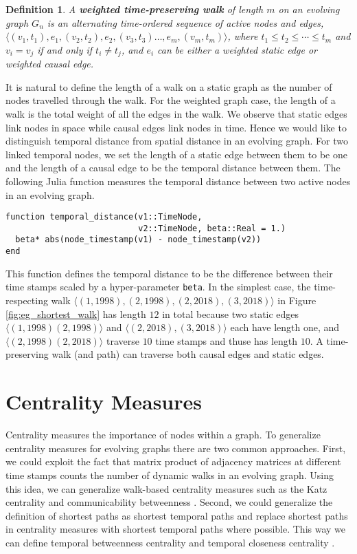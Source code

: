 \documentclass[12pt]{article}
\newtheorem{definition}{Definition}
\theoremstyle{definition}
\begin{document}
\begin{definition}
A \textbf{weighted time-preserving walk} of length $m$ on an evolving graph $G_n$ is an alternating
time-ordered sequence of active nodes and edges, $\langle (v_1, t_1), e_1, (v_2, t_2), e_2, (v_3, t_3) \ldots, e_m, (v_m, t_m) \rangle$, where $t_1 \le t_2 \le \cdots \le t_m$ and
$v_i = v_j$ if and only if $t_i \ne t_j$, and $e_i$ can be either a weighted static edge or weighted causal edge.
\end{definition}

It is natural to define the length of a walk on a static graph as the number of nodes travelled through the walk. For the weighted graph case, the length of a walk is the total weight of all the edges in the walk. We observe that static edges link nodes in space while causal edges link nodes in time. Hence we would like to distinguish temporal distance from spatial distance in an evolving graph.
For two linked temporal nodes, we set the length of a static edge between them to be one and the length of a causal edge to be the temporal distance between them.
The following Julia function measures the temporal distance between two active nodes in an evolving graph.
\begin{lstlisting}
function temporal_distance(v1::TimeNode,
                           v2::TimeNode, beta::Real = 1.)
  beta* abs(node_timestamp(v1) - node_timestamp(v2))
end
\end{lstlisting}
This function defines the temporal distance to be the difference between their time stamps scaled by a hyper-parameter
\texttt{beta}.
In the simplest case, the time-respecting walk
$\langle (1, 1998) ,(2, 1998) , (2, 2018), (3, 2018)\rangle$ in Figure \ref{fig:eg_shortest_walk} has length $12$ in total because two static edges $\langle (1, 1998) (2, 1998) \rangle$ and $\langle (2, 2018), (3, 2018) \rangle$ each have length one, and $\langle (2, 1998) (2, 2018) \rangle$
traverse $10$ time stamps and thuse has length $10$.
A time-preserving walk (and path) can traverse both causal edges and static edges.

\section{Centrality Measures}
\label{sec:topol-temp-flow}

Centrality measures the importance of nodes within a graph.
To generalize centrality measures for evolving graphs there are two common approaches.
First, we could exploit the fact that matrix product of adjacency matrices at different time stamps counts the number of dynamic walks in an evolving graph. Using this idea, we can generalize walk-based centrality measures such as
the Katz centrality \cite{estrada09} and communicability betweenness \cite{alsayed15}.
Second, we could generalize the definition of shortest paths as shortest temporal paths and replace shortest paths in centrality measures with shortest temporal paths where possible. This way we can define temporal betweenness centrality and temporal closeness centrality \cite{ntmm13}.
\end{document}
